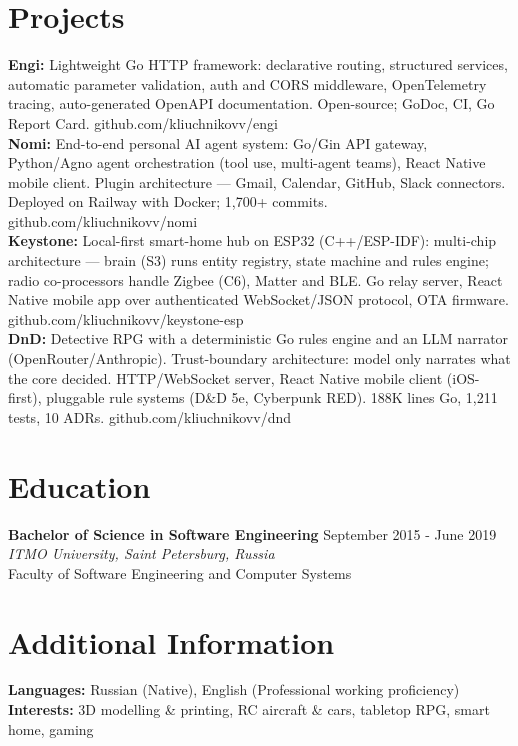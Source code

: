 \documentclass[11pt,a4paper]{article}
\begin{document}
\section{Projects}
\textbf{Engi:} Lightweight Go HTTP framework: declarative routing, structured services, automatic parameter validation, auth and CORS middleware, OpenTelemetry tracing, auto-generated OpenAPI documentation. Open-source; GoDoc, CI, Go Report Card. github.com/kliuchnikovv/engi\\[4pt]
\textbf{Nomi:} End-to-end personal AI agent system: Go/Gin API gateway, Python/Agno agent orchestration (tool use, multi-agent teams), React Native mobile client. Plugin architecture --- Gmail, Calendar, GitHub, Slack connectors. Deployed on Railway with Docker; 1,700+ commits. github.com/kliuchnikovv/nomi\\[4pt]
\textbf{Keystone:} Local-first smart-home hub on ESP32 (C++/ESP-IDF): multi-chip architecture --- brain (S3) runs entity registry, state machine and rules engine; radio co-processors handle Zigbee (C6), Matter and BLE. Go relay server, React Native mobile app over authenticated WebSocket/JSON protocol, OTA firmware. github.com/kliuchnikovv/keystone-esp\\[4pt]
\textbf{DnD:} Detective RPG with a deterministic Go rules engine and an LLM narrator (OpenRouter/Anthropic). Trust-boundary architecture: model only narrates what the core decided. HTTP/WebSocket server, React Native mobile client (iOS-first), pluggable rule systems (D\&D 5e, Cyberpunk RED). 188K lines Go, 1,211 tests, 10 ADRs. github.com/kliuchnikovv/dnd

\section{Education}
\textbf{Bachelor of Science in Software Engineering} \hfill September 2015 - June 2019\\
\textit{ITMO University, Saint Petersburg, Russia}\\
Faculty of Software Engineering and Computer Systems

\section{Additional Information}
\textbf{Languages:} Russian (Native), English (Professional working proficiency)\\
\textbf{Interests:} 3D modelling \& printing, RC aircraft \& cars, tabletop RPG, smart home, gaming
\end{document}
